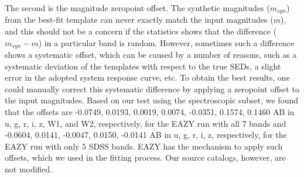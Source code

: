\documentclass[apj,iop]{emulateapj}
\begin{document}



The second is the magnitude zeropoint offset. The synthetic magnitudes ($m_{syn}$) from the best-fit template can never exactly match the input magnitudes ($m$), and this should not be a concern if the statistics shows that the difference ($m_{syn} - m$) in a particular band is random. However, sometimes such a difference shows a systematic offset, which can be caused by a number of reasons, such as a systematic deviation of the templates with respect to the true SEDs, a slight error in the adopted system response curve, etc. To obtain the best results, one could manually correct this systematic difference by applying a zeropoint offset to the input magnitudes. Based on our test using the spectroscopic subset, we found that the offsets are -0.0749, 0.0193, 0.0019, 0.0074, -0.0351, 0.1574, 0.1460 AB in u, g, r, i, z, W1, and W2, respectively, for the EAZY run with all 7 bands and -0.0604, 0.0141, -0.0047, 0.0150, -0.0141 AB in u, g, r, i, z, respectively, for the EAZY run with only 5 SDSS bands. EAZY has the mechanism to apply such offsets, which we used in the fitting process. Our source catalogs, however, are not modified.


\end{document}
